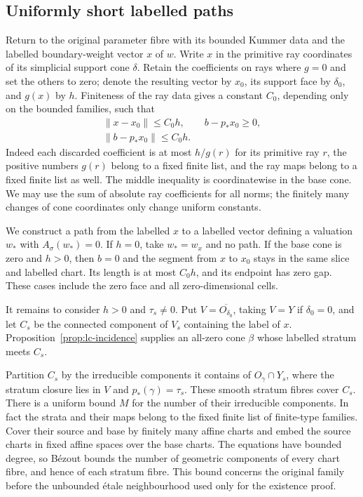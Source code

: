 \subsection{Uniformly short labelled paths}

Return to the original parameter fibre with its bounded Kummer data
and the labelled boundary-weight vector $x$ of $w$.
Write $x$ in the primitive ray coordinates of its simplicial support
cone $\delta$.  Retain the coefficients on rays where $g=0$ and set
the others to zero; denote the resulting vector by $x_0$, its support
face by $\delta_0$, and $g(x)$ by $h$.  Finiteness of the ray data
gives a constant $C_0$, depending only on the bounded families, such that
\begin{equation}\label{inc:projection}
 \begin{gathered}
 \|x-x_0\|\leq C_0h,\qquad b-p_*x_0\geq 0,\\
 \|b-p_*x_0\|\leq C_0h.
 \end{gathered}
\end{equation}
Indeed each discarded coefficient is at most $h/g(r)$ for its primitive
ray $r$, the positive numbers $g(r)$ belong to a fixed finite list, and
the ray maps belong to a fixed finite list as well.  The middle
inequality is coordinatewise in the base cone.  We may use the sum of
absolute ray coefficients for all norms; the finitely many changes of
cone coordinates only change uniform constants.

We construct a path
from the labelled $x$ to a labelled vector defining a valuation $w_*$
with $A_\sigma(w_*)=0$.  If $h=0$, take $w_*=w_x$ and no path.
If the base cone is zero and $h>0$, then $b=0$ and the segment from
$x$ to $x_0$ stays in the same slice and labelled chart.  Its length
is at most $C_0h$, and its endpoint has zero gap.  These cases include
the zero face and all zero-dimensional cells.

It remains to consider $h>0$ and $\tau_s\ne0$.  Put
$V=\overline{O_{\delta_0}}$, taking $V=Y$ if $\delta_0=0$, and
let $C_s$ be the connected component of $V_s$ containing the label
of $x$.  Proposition~\ref{prop:lc-incidence} supplies an all-zero
cone $\beta$ whose labelled stratum meets $C_s$.

Partition $C_s$ by the irreducible components it contains of
$O_\gamma\cap Y_s$, where the stratum closure lies in $V$ and
$p_*(\gamma)=\tau_s$.  These smooth stratum fibres cover $C_s$.
There is a uniform bound $M$ for the number of their irreducible
components.  In fact the strata and their maps belong to the fixed
finite list of finite-type families.  Cover their source and base
by finitely many affine charts and embed the source charts in fixed
affine spaces over the base charts.  The equations have bounded degree,
so B\'{e}zout bounds the number of geometric components of every chart
fibre, and hence of each stratum fibre.  This bound concerns the original
family before the unbounded \'{e}tale neighbourhood used only for
the existence proof.


